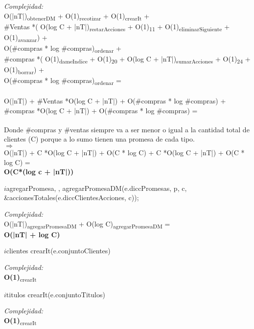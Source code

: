 \textit{Complejidad:}  \\
O(|nT|)\textsubscript{obtenerDM} + 
O(1)\textsubscript{recotizar} +
O(1)\textsubscript{crearIt} + \\
\#Ventas *(
O(log C + |nT|)\textsubscript{restarAcciones} +
O(1)\textsubscript{11} +
O(1)\textsubscript{eliminarSiguiente} +
O(1)\textsubscript{avanzar}) + \\
O(\#compras * log \#compras)\textsubscript{ordenar} + \\
\#compras *(
O(1)\textsubscript{dameIndice} +
O(1)\textsubscript{20} +
O(log C + |nT|)\textsubscript{sumarAcciones} +
O(1)\textsubscript{24} +
O(1)\textsubscript{borrar}) + \\
O(\#compras * log \#compras)\textsubscript{ordenar} = \\
\\
O(|nT|) + \#Ventas *O(log C + |nT|) + O(\#compras * log \#compras) + \#compras *O(log C + |nT|) + O(\#compras * log \#compras) = \\
\\
Donde \#compras y \#ventas siempre va a ser menor o igual a la cantidad total de clientes (C) porque a lo sumo tienen una promesa de cada tipo. \\
$\Rightarrow$ \\
O(|nT|) + C *O(log C + |nT|) + O(C * log C) + C *O(log C + |nT|) + O(C * log C) = \\
\textbf{O(C*(log c + |nT|))} \\

\begin{algorithm}{$i$agregarPromesa}{, , }{}
agregarPromesaDM(e.diccPromesas, p, c, \&accionesTotales(e.diccClientesAcciones, c));
			\end{algorithm}	
	\textit{Complejidad:}  \\
O(|nT|)\textsubscript{agregarPromesaDM} + O(log C)\textsubscript{agregarPromesaDM}	= \\
\textbf{O(|nT| + log C)} \\
					
				
\begin{algorithm}{$i$clientes}{}{}
\RETURN crearIt(e.conjuntoClientes)
			\end{algorithm}
\textit{Complejidad:}  \\
\textbf{O(1)}\textsubscript{crearIt}
				
\begin{algorithm}{$i$titulos}{}{}
\RETURN crearIt(e.conjuntoTitulos)
			\end{algorithm}	
\textit{Complejidad:}  \\
\textbf{O(1)}\textsubscript{crearIt}

